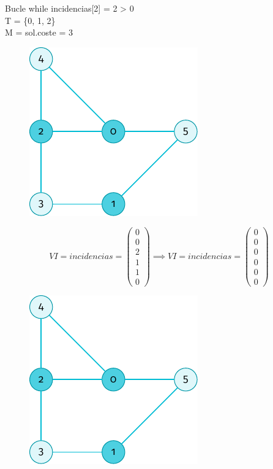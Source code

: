 \documentclass[spanish]{beamer}
\begin{document}
\begin{frame}{Bucle while}
	incidencias[2] = 2 > 0\\
	T = \{0, 1, 2\}\\
	M = sol.coste = 3
	\begin{figure}[H]
		\centering \includegraphics{./img/grafo-ejemplo.pdf}
	\end{figure}
\end{frame}

\begin{frame}{}
	$$  VI = incidencias = 
	\begin{pmatrix}
	  0 \\
	  0 \\
	  2 \\
	  1 \\
	  1 \\
	  0
	\end{pmatrix} \implies  VI = incidencias = 
	\begin{pmatrix}	
	  0 \\
	  0 \\
	  0 \\
	  0 \\
	  0 \\
	  0
	\end{pmatrix}$$
	\begin{figure}[H]
		\centering \includegraphics{./img/grafo-ejemplo.pdf}
	\end{figure}
\end{frame}
\end{document}
